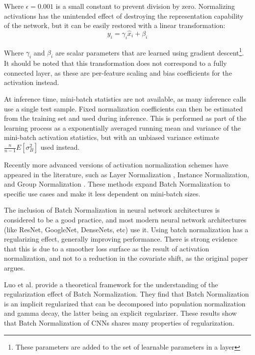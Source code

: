 Where $\epsilon = 0.001$ is a small constant to prevent division by zero. Normalizing activations has the unintended effect of destroying the representation capability of the network, but it can be easily restored with a linear transformation:
\vspace*{1em}
\begin{equation}
    y_i = \gamma_i \hat{x}_i + \beta_i
\end{equation}

Where $\gamma_i$ and $\beta_i$ are scalar parameters that are learned using gradient descent\footnote{These parameters are added to the set of learnable parameters in a layer}. It should be noted that this transformation does not correspond to a fully connected layer, as these are per-feature scaling and bias coefficients for the activation instead.

At inference time, mini-batch statistics are not available, as many inference calls use a single test sample. Fixed normalization coefficients can then be estimated from the training set and used during inference. This is performed as part of the learning process as a exponentially averaged running mean and variance of the mini-batch activation statistics, but with an unbiased variance estimate $\frac{n}{n-1} E[\sigma^2_{B}]$ used instead.

Recently more advanced versions of activation normalization schemes have appeared in the literature, such as Layer Normalization \cite[-7em]{ba2016layer}, Instance Normalization, and Group Normalization \cite[-2em]{wu2018group}. These methods expand Batch Normalization to specific use cases and make it less dependent on mini-batch sizes.

The inclusion of Batch Normalization in neural network architectures is considered to be a good practice, and most modern neural network architectures (like ResNet, GoogleNet, DenseNets, etc) use it. Using batch normalization has a regularizing effect, generally improving performance. There is strong evidence that this is due to a smoother loss surface \cite[-6em]{santurkar2018does} as the result of activation normalization, and not to a reduction in the covariate shift, as the original paper argues.

Luo et al. \cite{luo2018understanding} provide a theoretical framework for the understanding of the regularization effect of Batch Normalization. They find that Batch Normalization is an implicit regularized that can be decomposed into population normalization and gamma decay, the latter being an explicit regularizer. These results show that Batch Normalization of CNNs shares many properties of regularization.

